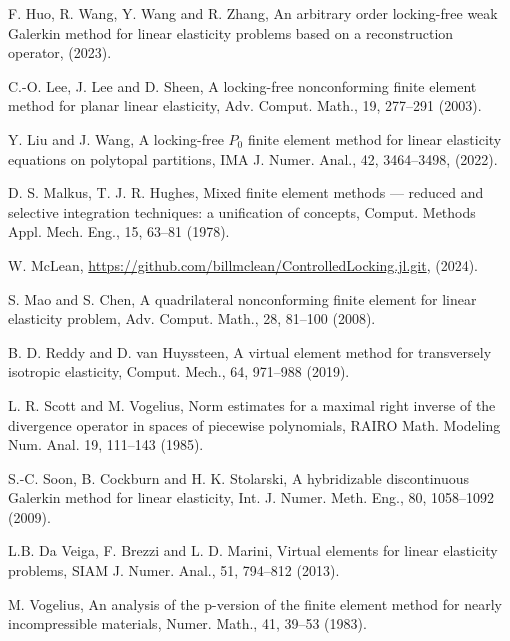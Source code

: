 \documentclass[11pt]{article}
\numberwithin{equation}{section}
\begin{document}
\begin{thebibliography}{99.}
 F. Huo, R. Wang, Y. Wang and  R. Zhang, An arbitrary order locking-free weak Galerkin method for linear elasticity problems based on a reconstruction operator, (2023).


 C.-O. Lee, J. Lee and  D. Sheen, A locking-free nonconforming finite element method for planar linear elasticity, Adv. Comput. Math., 19, 277--291 (2003).

 Y. Liu and  J. Wang, A locking-free $P_0$ finite element method for linear elasticity equations on polytopal partitions, IMA J. Numer. Anal., 42, 3464--3498, (2022).

 D. S. Malkus, T. J. R. Hughes, Mixed finite element methods — reduced and selective integration techniques: a unification of concepts, Comput. Methods Appl. Mech. Eng., 15, 63--81 (1978).

 W. McLean,  \url{https://github.com/billmclean/ControlledLocking.jl.git}, (2024).

 S. Mao and  S. Chen, A quadrilateral nonconforming finite element for linear elasticity problem, Adv. Comput. Math., 28, 81--100 (2008).

 B. D. Reddy and  D. van Huyssteen, A virtual element method for transversely isotropic elasticity, Comput. Mech., 64, 971--988 (2019).

 L. R. Scott and M. Vogelius, Norm estimates for a maximal right inverse of the divergence operator in spaces of piecewise polynomials, RAIRO Math. Modeling Num. Anal. 19, 111--143 (1985).

 S.-C. Soon, B. Cockburn and H. K. Stolarski, A hybridizable discontinuous Galerkin method for linear elasticity, Int. J. Numer. Meth.  Eng., 80, 1058--1092 (2009).


 L.B. Da Veiga, F. Brezzi and  L. D. Marini, Virtual elements for linear elasticity problems, SIAM J. Numer. Anal., 51, 794--812 (2013).

 M. Vogelius, An analysis of the p-version of the finite element method for nearly incompressible materials, Numer. Math., 41, 39--53 (1983).


\end{thebibliography}
\end{document}
